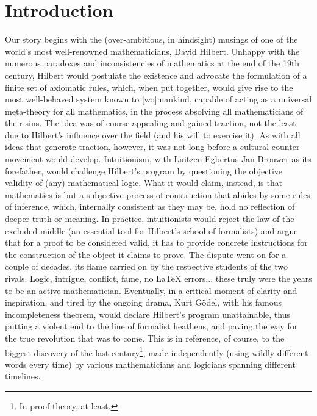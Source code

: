 \chapter{Introduction}
\label{chapter:Introduction}


Our story begins with the (over-ambitious, in hindsight) musings of one of the world's most well-renowned mathematicians, David Hilbert. 
Unhappy with the numerous paradoxes and inconsistencies of mathematics at the end of the 19th century, Hilbert would postulate the existence and advocate the formulation of a finite set of axiomatic rules, which, when put together, would give rise to the most well-behaved system known to [wo]mankind, capable of acting as a universal meta-theory for all mathematics, in the process absolving all mathematicians of their sins.
The idea was of course appealing and gained traction, not the least due to Hilbert's influence over the field (and his will to exercise it).
As with all ideas that generate traction, however, it was not long before a cultural counter-movement would develop.
Intuitionism, with Luitzen Egbertus Jan Brouwer as its forefather, would challenge Hilbert's program by questioning the objective validity of (any) mathematical logic.
What it would claim, instead, is that mathematics is but a subjective process of construction that abides by some rules of inference, which, internally consistent as they may be, hold no reflection of deeper truth or meaning.
In practice, intuitionists would reject the law of the excluded middle (an essential tool for Hilbert's school of formalists) and argue that for a proof to be considered valid, it has to provide concrete instructions for the construction of the object it claims to prove.
The dispute went on for a couple of decades, its flame carried on by the respective students of the two rivals.
Logic, intrigue, conflict, fame, no \LaTeX{} errors...  these truly were the years to be an active mathematician.
Eventually, in a critical moment of clarity and inspiration, and tired by the ongoing drama, Kurt G\"odel, with his famous incompleteness theorem, would declare Hilbert's program unattainable, thus putting a violent end to the line of formalist heathens, and paving the way for the true revolution that was to come.
This is in reference, of course, to the biggest discovery of the last century\footnote{In proof theory, at least.}, made independently (using wildly different words every time) by various mathematicians and logicians spanning different timelines.
